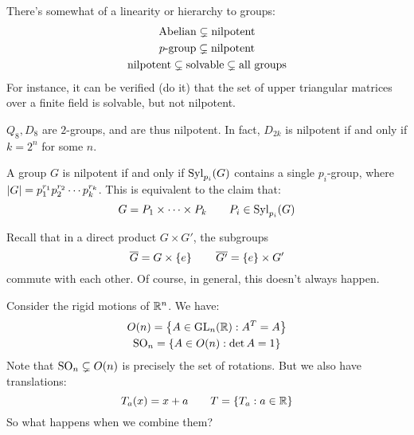 There's somewhat of a linearity or hierarchy to groups:
\begin{gather*}
    \textrm{Abelian} \subsetneq \textrm{nilpotent} \\
    p\textrm{-group} \subsetneq \textrm{nilpotent} \\
    \textrm{nilpotent} \subsetneq \textrm{solvable} \subsetneq \textrm{all groups}
\end{gather*}
For instance, it can be verified (do it) that the set of upper triangular matrices over a finite
field is solvable, but not nilpotent.

$ Q_{8}, D_{8} $ are $ 2 $-groups, and are thus nilpotent.
In fact, $ D_{2k} $ is nilpotent if and only if $ k = 2^{n} $ for some $ n $.

\begin{thm}
    A group $ G $ is nilpotent if and only if $ \operatorname{Syl}_{p_{i}}(G) $ contains a single
    $ p_{i} $-group, where $ \abs{G} = p_{1}^{r_{1}}p_{2}^{r_{2}}\cdots p_{k}^{r_{k}} $. \vsp
    This is equivalent to the claim that:
    \begin{equation*}
        G = P_{1} \times \cdots \times P_{k} \qquad P_{i} \in \operatorname{Syl}_{p_{i}}(G)
    \end{equation*}
\end{thm}

Recall that in a direct product $ G \times G' $, the subgroups
\begin{equation*}
    \overline{G} = G \times \left\{{e}\right\} \qquad \overline{G'} = \left\{{e}\right\} \times G'
\end{equation*}
commute with each other.
Of course, in general, this doesn't always happen.

Consider the rigid motions of $ \mathbb{R}^{n} $. We have:
\begin{gather*}
    O(n) = \left\{{A \in \operatorname{GL}_{n}(\mathbb{R}) : A^{T} = A}\right\} \\
    \operatorname{SO}_{n} = \left\{{A \in O(n) : \det A = 1}\right\}
\end{gather*}
Note that $ \operatorname{SO}_{n} \subsetneq O(n) $ is precisely the set of rotations.
But we also have translations:
\begin{equation*}
    T_{a}(x) = x + a \qquad T = \left\{{T_{a} : a \in \mathbb{R}}\right\}
\end{equation*}
So what happens when we combine them?

